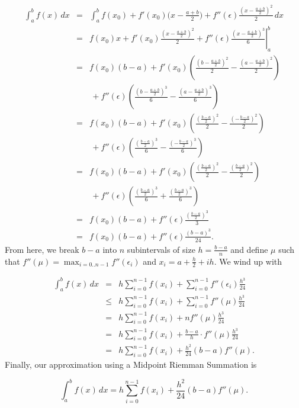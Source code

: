 \documentclass[12pt]{article}
\newcommand{\integral}[3]{\text{$\int^{#2}_{#1} #3\,dx$}}
\newcommand{\summation}[3]{\text{$\sum^{#2}_{#1} #3$}}
\begin{document}
\begin{eqnarray*} \integral{a}{b}{f(x)} &=& \integral{a}{b}{f(x_0) + f'(x_0)\Big(x - \frac{a+b}{2}\Big) + f''(\epsilon)\frac{(x - \frac{a+b}{2})^2}{2}} \\
&=& \left.f(x_0)x + f'(x_0)\frac{(x - \frac{a+b}{2})^2}{2} + f''(\epsilon)\frac{(x - \frac{a+b}{2})^3}{6}\right|_a^b \\
&=& f(x_0)(b-a) + f'(x_0)\left(\frac{(b - \frac{a+b}{2})^2}{2} -\frac{(a - \frac{a+b}{2})^2}{2}\right) \\
& &\, + f''(\epsilon)\left(\frac{(b - \frac{a+b}{2})^3}{6} - \frac{(a - \frac{a+b}{2})^3}{6} \right) \\
&=& f(x_0)(b-a) + f'(x_0)\left(\frac{(\frac{b-a}{2})^2}{2} -\frac{(-\frac{b-a}{2})^2}{2}\right) \\
& &\, + f''(\epsilon)\left(\frac{(\frac{b-a}{2})^3}{6} - \frac{(-\frac{b-a}{2})^3}{6} \right) \\
&=& f(x_0)(b-a) + f'(x_0)\left(\frac{(\frac{b-a}{2})^2}{2} -\frac{(\frac{b-a}{2})^2}{2}\right) \\
& &\, + f''(\epsilon)\left(\frac{(\frac{b-a}{2})^3}{6} + \frac{(\frac{b-a}{2})^3}{6} \right) \\
&=& f(x_0)(b-a) + f''(\epsilon)\frac{(\frac{b-a}{2})^3}{3}  \\
&=& f(x_0)(b-a) + f''(\epsilon)\frac{(b-a)^3}{24}.
\end{eqnarray*}
From here, we break $b-a$ into $n$ subintervals of size $h=\frac{b-a}{n}$ and define $\mu$ such that $f''(\mu) = \displaystyle\max_{i=0..n-1}f''(\epsilon_i)$  and $x_i = a + \frac{h}{2} + ih$. We wind up with

\begin{eqnarray*} \integral{a}{b}{f(x)} &=& h\summation{i=0}{n-1}{f(x_i)} + \summation{i=0}{n-1}{f''(\epsilon_i)\frac{h^3}{24}} \\
&\leq& h\summation{i=0}{n-1}{f(x_i)} + \summation{i=0}{n-1}{f''(\mu)\frac{h^3}{24}} \\
&=& h\summation{i=0}{n-1}{f(x_i)} + nf''(\mu)\frac{h^3}{24} \\
&=& h\summation{i=0}{n-1}{f(x_i)} + \frac{b-a}{h}\cdot f''(\mu)\frac{h^3}{24} \\
&=& h\summation{i=0}{n-1}{f(x_i)} +  \frac{h^2}{24}(b-a)f''(\mu).
\end{eqnarray*}
Finally, our approximation using a Midpoint Riemman Summation is 

\begin{equation*} \integral{a}{b}{f(x)} = h\summation{i=0}{n-1}{f(x_i)} + \frac{h^2}{24}(b-a)f''(\mu). \end{equation*}
\end{document}
